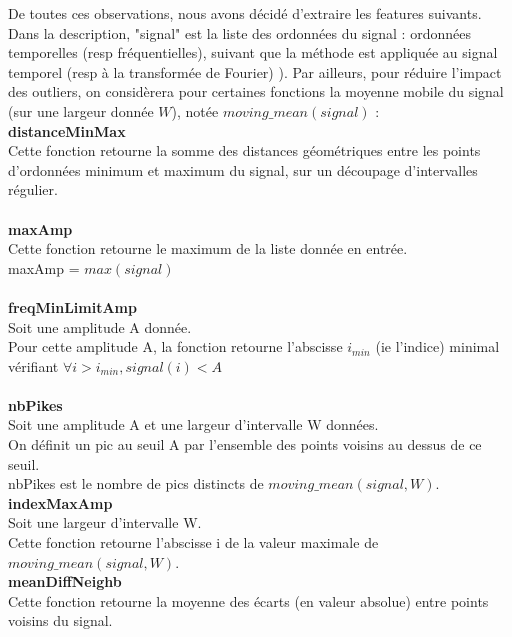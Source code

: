 \documentclass{article}
\begin{document}
De toutes ces observations, nous avons décidé d'extraire les features suivants. Dans la description, "signal" est la liste des ordonnées du signal : ordonnées temporelles (resp fréquentielles), suivant que la méthode est appliquée au signal temporel (resp à la transformée de Fourier) ). Par ailleurs, pour réduire l'impact des outliers, on considèrera pour certaines fonctions la moyenne mobile du signal (sur une largeur donnée $W$), notée $moving\_mean(signal)$ :
\\

\textbf{distanceMinMax} \\
Cette fonction retourne la somme des distances géométriques entre les points d'ordonnées minimum et maximum du signal, sur un découpage d'intervalles régulier.\\\\

\textbf{maxAmp} \\
Cette fonction retourne le maximum de la liste donnée en entrée.\\
maxAmp = $max(signal)$ \\\\

\textbf{freqMinLimitAmp} \\
Soit une amplitude A donnée. \\
Pour cette amplitude A, la fonction retourne l'abscisse $i_{min}$ (ie l'indice) minimal vérifiant $\forall i > i_{min}, signal(i)< A$\\\\

\textbf{nbPikes} \\
Soit une amplitude A et une largeur d'intervalle W données.\\

On définit un pic au seuil A par l'ensemble des points voisins au dessus de ce seuil. \\
nbPikes est le nombre de pics distincts de $moving\_mean(signal,W)$. \\

\textbf{indexMaxAmp} \\
Soit une largeur d'intervalle W. \\
Cette fonction retourne l'abscisse i de la valeur maximale de $moving\_mean(signal,W)$. \\


\textbf{meanDiffNeighb} \\
Cette fonction retourne la moyenne des écarts (en valeur absolue) entre points voisins du signal. \\
\end{document}
